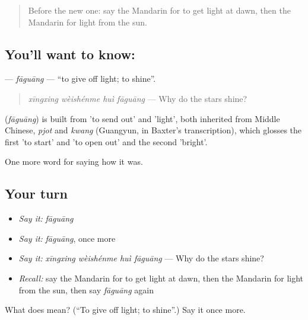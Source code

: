\label{lesson:ZH-C517-faguang}



\begin{quote}
Before the new one: say the Mandarin for to get light at dawn, then the Mandarin for light from the sun.
\end{quote}

\subsection*{You'll want to know: }
\textbf{} — \emph{fāguāng} — \textquotedblleft{}to give off light; to shine\textquotedblright{}.

\begin{quote}
\textbf{} \emph{xīngxing wèishénme huì fāguāng} — Why do the stars shine?
\end{quote}

\begin{cousinweb}
\textbf{} (\emph{fāguāng}) is built from  'to send out' and  'light', both inherited from Middle Chinese, \emph{pjot} and \emph{kwang} (Guangyun, in Baxter's transcription), which glosses the first 'to start' and 'to open out' and the second 'bright'.
\end{cousinweb}

\begin{grammarlens}[title={What you've built}]
One more word for saying how it was.
\end{grammarlens}

\subsection*{Your turn}
\begin{itemize}
\raggedright
  \item \emph{Say it:} \emph{fāguāng}
  \item \emph{Say it:} \emph{fāguāng}, once more
  \item \emph{Say it:} \emph{xīngxing wèishénme huì fāguāng} — Why do the stars shine?
  \item \emph{Recall:} say the Mandarin for to get light at dawn, then the Mandarin for light from the sun, then say \emph{fāguāng} again
\end{itemize}

\begin{tcolorbox}[breakable,colback=teal!4,colframe=teal!35!black,title={Before you move on}]
What does  mean? (\textquotedblleft{}To give off light; to shine\textquotedblright{}.) Say it once more.
\end{tcolorbox}
